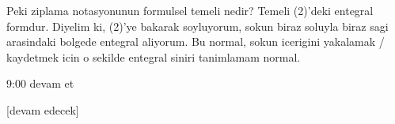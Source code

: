 \documentclass[12pt,fleqn]{article}\usepackage{../../common}
\begin{document}
Peki ziplama notasyonunun formulsel temeli nedir? Temeli (2)'deki entegral
formdur. Diyelim ki, (2)'ye bakarak soyluyorum, sokun biraz soluyla biraz
sagi arasindaki bolgede entegral aliyorum. Bu normal, sokun icerigini
yakalamak / kaydetmek icin o sekilde entegral siniri tanimlamam normal.


9:00 devam et


















[devam edecek]
\end{document}
